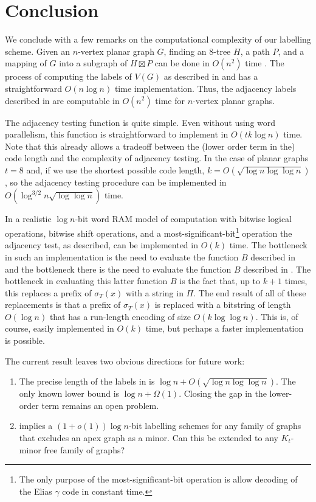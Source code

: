 \documentclass[kpfonts]{patmorin}
\newcommand{\snote}[1]{\fcolorbox{red}{yellow}{#1}}
\begin{document}
\section{Conclusion}

We conclude with a few remarks on the computational complexity of our labelling scheme.  Given an $n$-vertex planar graph $G$, finding an 8-tree $H$, a path $P$, and a mapping of $G$ into a subgraph of $H\boxtimes P$ can be done in $O(n^2)$ time \cite{dujmovic.joret.ea:planar}.  The process of computing the labels of $V(G)$ as described in  and  has a straightforward $O(n\log n)$ time implementation.  Thus, the adjacency labels described in  are computable in $O(n^2)$ time for $n$-vertex planar graphs.

The adjacency testing function is quite simple. Even without using word parallelism, this function is straightforward to implement in $O(tk\log n)$ time.  Note that this already allows a tradeoff between the (lower order term in the) code length and the complexity of adjacency testing.
In the case of planar graphs $t=8$ and, if we use the shortest possible code length, $k=O(\sqrt{\log n\log\log n})$, so the adjacency testing procedure can be implemented in $O(\log^{3/2} n\sqrt{\log\log n})$ time. 

In a realistic $\log n$-bit word RAM model of computation with bitwise logical operations, bitwise shift operations, and a most-significant-bit\footnote{The only purpose of the most-significant-bit operation is allow decoding of the Elias $\gamma$ code in constant time.} operation the adjacency test, as described, can be implemented in $O(k)$ time.  The bottleneck in such an implementation is the need to evaluate the function $B$ described in  and the bottleneck there is the need to evaluate the function $B$ described in .  The bottleneck in evaluating this latter function $B$ is the fact that, up to $k+1$ times, this replaces a prefix of $\sigma_T(x)$ with a string in $\Pi$.  The end result of all of these replacements is that a prefix of $\sigma_T(x)$ is replaced with a bitstring of length $O(\log n)$ that has a run-length encoding of size $O(k\log\log n)$.  This is, of course, easily implemented in $O(k)$ time, but perhaps a faster implementation is possible.

The current result leaves two obvious directions for future work:
\begin{enumerate}
  \item The precise length of the labels in  is $\log n + O(\sqrt{\log n\log\log n})$.  The only known lower bound is $\log n + \Omega(1)$.  Closing the gap in the lower-order term remains an open problem.
  
  \item {} implies a $(1+o(1))\log n$-bit labelling schemes for any family of graphs that excludes an apex graph as a minor.  Can this be extended to any $K_t$-minor free family of graphs?
\end{enumerate}
\end{document}
